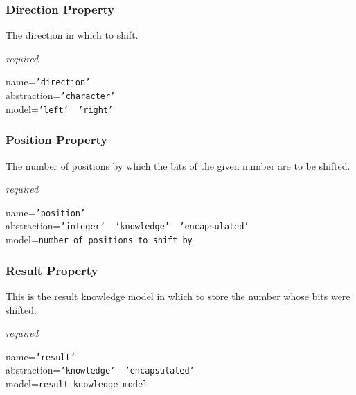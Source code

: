 \subsubsection{Direction Property}

The direction in which to shift.

\emph{required}

name=\texttt{'direction'}\\
abstraction=\texttt{'character'}\\
model=\texttt{'left' \vline\ 'right'}

\subsubsection{Position Property}

The number of positions by which the bits of the given number are to be shifted.

\emph{required}

name=\texttt{'position'}\\
abstraction=\texttt{'integer' \vline\ 'knowledge' \vline\ 'encapsulated'}\\
model=\texttt{number of positions to shift by}

\subsubsection{Result Property}

This is the result knowledge model in which to store the number whose bits were
shifted.

\emph{required}

name=\texttt{'result'}\\
abstraction=\texttt{'knowledge' \vline\ 'encapsulated'}\\
model=\texttt{result knowledge model}
